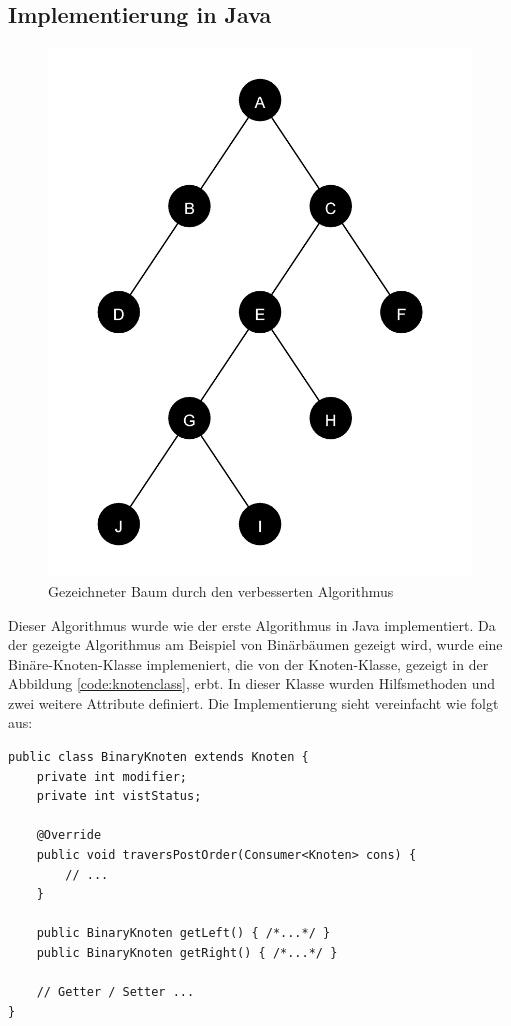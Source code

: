 \subsection{Implementierung in Java}
\begin{figure}[H]
    \centering
    \includegraphics[scale = 0.10]{abbildungen/baum_algo_2}
    \caption{Gezeichneter Baum durch den verbesserten Algorithmus}
    \label{pic:baum_algo_2} 
\end{figure}

Dieser Algorithmus wurde wie der erste Algorithmus in Java implementiert. Da der gezeigte Algorithmus
am Beispiel von Binärbäumen gezeigt wird, wurde eine Binäre-Knoten-Klasse implemeniert,
die von der Knoten-Klasse, gezeigt in der Abbildung \ref{code:knotenclass}, erbt. In dieser Klasse wurden
Hilfsmethoden und zwei weitere Attribute definiert. Die Implementierung sieht vereinfacht wie folgt aus:

\begin{lstlisting}[caption=Vereinfachte Implementierung der BinaryKnoten-Klasse, label=code:binaryknotenclass]
public class BinaryKnoten extends Knoten {
    private int modifier;
	private int vistStatus;

    @Override
	public void traversPostOrder(Consumer<Knoten> cons) { 
        // ...
    }

    public BinaryKnoten getLeft() { /*...*/ }
    public BinaryKnoten getRight() { /*...*/ }

    // Getter / Setter ...
}
\end{lstlisting}

